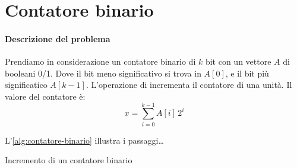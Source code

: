\section{Contatore binario}

\paragraph{Descrizione del problema}
Prendiamo in considerazione un contatore binario di \(k\) bit con un vettore \(A\) di booleani 0/1.
Dove il bit meno significativo si trova in \(A[0]\), e il bit più significatico \(A[k-1]\).
L'operazione di \increment{} incrementa il contatore di una unità.
Il valore del contatore è:
\[
    x = \sum_{i=0}^{k-1} A[i] \, 2^i
\]

L'\cref{alg:contatore-binario} illustra i passaggi\dots

\begin{algorithm}[hb]
    \caption{Incremento di un contatore binario}%
    \label{alg:contatore-binario}
\end{algorithm}

